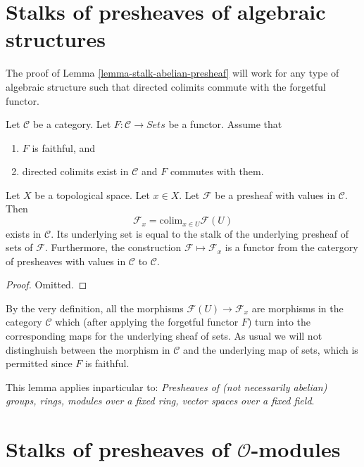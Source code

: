 \section{Stalks of presheaves of algebraic structures}
\label{section-stalks-presheaves-structures}

\noindent
The proof of Lemma \ref{lemma-stalk-abelian-presheaf} will work
for any type of algebraic structure such that directed
colimits commute with the forgetful functor.

\begin{lemma}
\label{lemma-stalk-presheaf-values-in-category}
Let $\mathcal{C}$ be a category. Let $F : \mathcal{C} \to \textit{Sets}$
be a functor. Assume that
\begin{enumerate}
\item $F$ is faithful, and
\item directed colimits exist in $\mathcal{C}$ and $F$ commutes with
them.
\end{enumerate}
Let $X$ be a topological space. Let $x \in X$. Let $\mathcal{F}$
be a presheaf with values in $\mathcal{C}$.
Then
$$
\mathcal{F}_x = \text{colim}_{x\in U} \mathcal{F}(U)
$$
exists in $\mathcal{C}$. Its underlying set is equal to the
stalk of the underlying presheaf of sets of $\mathcal{F}$.
Furthermore, the construction $\mathcal{F} \mapsto \mathcal{F}_x$
is a functor from the catergory of presheaves with values in
$\mathcal{C}$ to $\mathcal{C}$.
\end{lemma}

\begin{proof}
Omitted.
\end{proof}

\noindent
By the very definition, all the morphisms $\mathcal{F}(U)
\to \mathcal{F}_x$ are morphisms in the category $\mathcal{C}$
which (after applying the forgetful functor $F$) turn into
the corresponding maps for the underlying sheaf of sets.
As usual we will not distinghuish between the morphism
in $\mathcal{C}$ and the underlying map of sets, which
is permitted since $F$ is faithful.

\medskip\noindent
This lemma applies inparticular to:
{\it Presheaves of (not necessarily abelian) groups, rings, modules
over a fixed ring, vector spaces over a fixed field}.

\section{Stalks of presheaves of $\mathcal{O}$-modules}
\label{section-stalk-presheaves-modules}

